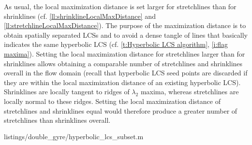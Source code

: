 \documentclass{elsarticle}
\begin{document}
As usual, the local maximization distance is set larger for stretchlines than for shrinklines (cf. \cref{ll:shrinklineLocalMaxDistance} and \cref{ll:stretchlineLocalMaxDistance}). The purpose of the maximization distance is to obtain spatially separated LCSs and to avoid a dense tangle of lines that basically indicates the same hyperbolic LCS (cf. \cref{t:Hyperbolic LCS algorithm}, \cref{i:flag maxima}). Setting the local maximization distance for stretchlines larger than for shrinklines allows obtaining a comparable number of stretchlines and shrinklines overall in the flow domain (recall that hyperbolic LCS seed points are discarded if they are within the local maximization distance of an existing hyperbolic LCS). Shrinklines are locally tangent to ridges of $\lambda_2$ maxima, whereas stretchlines are locally normal to these ridges. Setting the local maximization distance of stretchlines and shrinklines equal would therefore produce a greater number of stretchlines than shrinklines overall.


        {listings/double_gyre/hyperbolic_lcs_subset.m}
\end{document}
